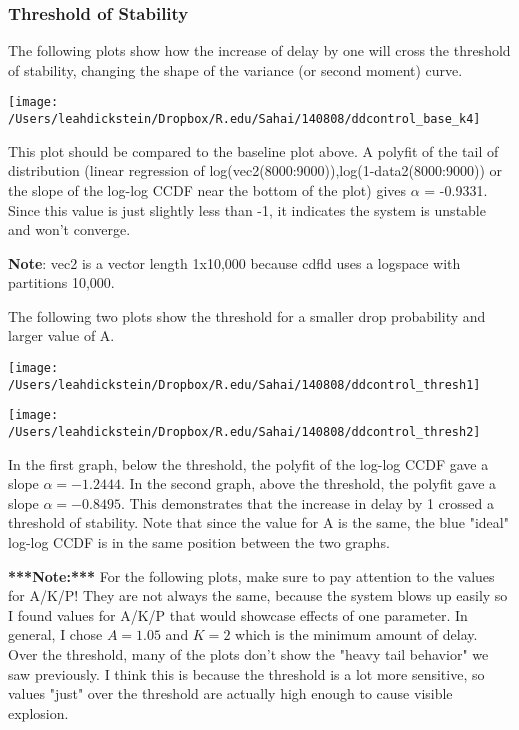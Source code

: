 \documentclass[leqno,twocolumn]{article}
\begin{document}
\subsubsection{Threshold of Stability}
The following plots show how the increase of delay by one will cross the threshold of stability, changing the shape of the variance (or second moment) curve.

\begin{center}
\texttt{[image: /Users/leahdickstein/Dropbox/R.edu/Sahai/140808/ddcontrol\_base\_k4]}\end{center}

This plot should be compared to the baseline plot above. A polyfit of the tail of distribution (linear regression of log(vec2(8000:9000)),log(1-data2(8000:9000)) or the slope of the log-log CCDF near the bottom of the plot) gives $\alpha$ = -0.9331. Since this value is just slightly less than -1, it indicates the system is unstable and won't converge.

\textbf{Note}: vec2 is a vector length 1x10,000 because cdfld uses a logspace with partitions 10,000.

The following two plots show the threshold for a smaller drop probability and larger value of A. 

\begin{minipage}[c]{0.5\textwidth}
\texttt{[image: /Users/leahdickstein/Dropbox/R.edu/Sahai/140808/ddcontrol\_thresh1]}
\end{minipage}
\begin{minipage}[c]{0.5\textwidth}
\texttt{[image: /Users/leahdickstein/Dropbox/R.edu/Sahai/140808/ddcontrol\_thresh2]}
\end{minipage}

In the first graph, below the threshold, the polyfit of the log-log CCDF gave a slope $\alpha = -1.2444$. In the second graph, above the threshold, the polyfit gave a slope $\alpha = -0.8495 $. This demonstrates that the increase in delay by 1 crossed a threshold of stability. Note that since the value for A is the same, the blue "ideal" log-log CCDF is in the same position between the two graphs.

\textbf{***Note:***} For the following plots, make sure to pay attention to the values for A/K/P! They are not always the same, because the system blows up easily so I found values for A/K/P that would showcase effects of one parameter. In general, I chose $A = 1.05$ and $K = 2$ which is the minimum amount of delay.\\
Over the threshold, many of the plots don't show the "heavy tail behavior" we saw previously. I think this is because the threshold is a lot more sensitive, so values "just" over the threshold are actually high enough to cause visible explosion.
\end{document}
